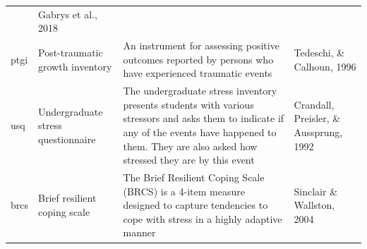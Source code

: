 \documentclass[]{book}
\begin{document}
\begin{longtable}[]{@{}llll@{}}
\begin{minipage}[t]{0.22\columnwidth}
\end{minipage} & \begin{minipage}[t]{0.18\columnwidth}\raggedright
Gabrys et al., 2018\strut
\end{minipage}\tabularnewline
\begin{minipage}[t]{0.22\columnwidth}\raggedright
ptgi\strut
\end{minipage} & \begin{minipage}[t]{0.27\columnwidth}\raggedright
Post-traumatic growth inventory\strut
\end{minipage} & \begin{minipage}[t]{0.22\columnwidth}\raggedright
An instrument for assessing positive outcomes reported by persons who have experienced traumatic events\strut
\end{minipage} & \begin{minipage}[t]{0.18\columnwidth}\raggedright
Tedeschi, \& Calhoun, 1996\strut
\end{minipage}\tabularnewline
\begin{minipage}[t]{0.22\columnwidth}\raggedright
usq\strut
\end{minipage} & \begin{minipage}[t]{0.27\columnwidth}\raggedright
Undergraduate stress questionnaire\strut
\end{minipage} & \begin{minipage}[t]{0.22\columnwidth}\raggedright
The undergraduate stress inventory presents students with various stressors and asks them to indicate if any of the events have happened to them. They are also asked how stressed they are by this event\strut
\end{minipage} & \begin{minipage}[t]{0.18\columnwidth}\raggedright
Crandall, Preisler, \& Aussprung, 1992\strut
\end{minipage}\tabularnewline
\begin{minipage}[t]{0.22\columnwidth}\raggedright
brcs\strut
\end{minipage} & \begin{minipage}[t]{0.27\columnwidth}\raggedright
Brief resilient coping scale\strut
\end{minipage} & \begin{minipage}[t]{0.22\columnwidth}\raggedright
The Brief Resilient Coping Scale (BRCS) is a 4-item measure designed to capture tendencies to cope with stress in a highly adaptive manner\strut
\end{minipage} & \begin{minipage}[t]{0.18\columnwidth}\raggedright
Sinclair \& Wallston, 2004\strut
\end{minipage}\tabularnewline
\bottomrule
\end{longtable}
\end{document}
